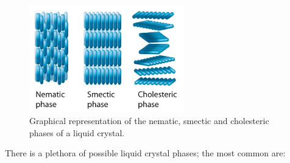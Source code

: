 \documentclass[../main/main.tex]{subfiles}
\begin{document}
 \begin{figure}[h!]
 \centering
 \includegraphics[width=0.6\textwidth]{../lessons/16_image/LC.png}
 \caption{\label{fig:16_LC} Graphical representation of the nematic, smectic and cholesteric phases of a liquid crystal.}
 \end{figure}


\noindent There is a plethora of possible liquid crystal phases; the most common are:
\end{document}
